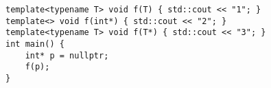\begin{tcolorbox}[left=0mm,right=0mm,top=0mm,bottom=0mm,boxsep=1mm,arc=0mm,boxrule=0pt, frame empty, breakable]
    \small
    \begin{lstlisting}
template<typename T> void f(T) { std::cout << "1"; }
template<> void f(int*) { std::cout << "2"; }
template<typename T> void f(T*) { std::cout << "3"; }
int main() {
    int* p = nullptr;
    f(p);
}
\end{lstlisting}
\end{tcolorbox}
